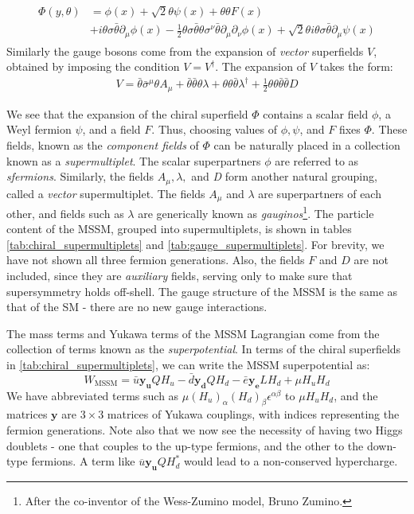 \begin{align}
  \begin{split}
  \Phi(y,\theta) &= \phi(x) + \sqrt{2}\theta\psi(x)+\theta\theta F(x)\\
  &+i\theta\sigma\bar{\theta}\partial_\mu\phi(x)-\frac{1}{2}\theta\sigma\bar{\theta}\theta\sigma^\nu\bar{\theta}\partial_\mu\partial_\nu\phi(x) + \sqrt{2}\theta i\theta\sigma\bar{\theta}\partial_\mu\psi(x)
\end{split}
  \label{eq:chiral_superfield_expansion}
\end{align}
Similarly the gauge bosons come from the expansion of \emph{vector} superfields $V$, obtained by imposing the condition $V = V^\dagger$. 
The expansion of $V$ takes the form:
\begin{align}
V = \bar{\theta}\bar{\sigma}^\mu\theta A_\mu+\bar{\theta}\bar{\theta}\theta\lambda+\theta\theta\bar{\theta}\lambda^\dagger+\frac{1}{2}\theta\theta\bar{\theta}\bar{\theta}D
\label{eq:vector_superfield_expansion}
\end{align}

We see that the expansion of the chiral superfield $\Phi$ contains a scalar field $\phi$, a Weyl fermion $\psi$, and a field $F$. Thus, choosing values of $\phi,\psi$, and $F$ fixes $\Phi$. These fields, known as the \emph{component fields} of $\Phi$ can be naturally placed in a collection known as a \emph{supermultiplet}. The scalar superpartners $\phi$ are referred to as \emph{sfermions}. 
Similarly, the fields $A_\mu,\lambda,$ and \emph{D} form another natural grouping, called a \emph{vector} supermultiplet. The fields $A_\mu$ and $\lambda$ are superpartners of each other, and fields such as $\lambda$ are generically known as \emph{gauginos}\footnote{After the co-inventor of the Wess-Zumino model, Bruno Zumino.}. The particle content of the MSSM, grouped into supermultiplets, is shown in tables \ref{tab:chiral_supermultiplets} and \ref{tab:gauge_supermultiplets}. For brevity, we have not shown all three fermion generations. Also, the fields $F$ and $D$ are not included, since they are \emph{auxiliary} fields, serving only to make sure that supersymmetry holds off-shell. The gauge structure of the MSSM is the same as that of the SM - there are no new gauge interactions.

The mass terms and Yukawa terms of the MSSM Lagrangian come from the collection of terms known as the \emph{superpotential}. 
In terms of the chiral superfields in \autoref{tab:chiral_supermultiplets}, we can write the MSSM superpotential as:
\[W_\text{MSSM} = \bar{u}\mathbf{y_u}QH_u-\bar{d}\mathbf{y_d}Q H_d-\bar{e}\mathbf{y_e}L H_d+\mu H_u H_d \]
We have abbreviated terms such as $\mu(H_u)_\alpha (H_d)_\beta\epsilon^{\alpha\beta}$ to $\mu H_u H_d$, and the matrices $\mathbf{y}$ are $3\times3$ matrices of Yukawa couplings, with indices representing the fermion generations. Note also that we now see the necessity of having two Higgs doublets - one that couples to the up-type fermions, and the other to the down-type fermions. A term like $\overline{u}\mathbf{y_u}QH_d^*$ would lead to a non-conserved hypercharge.

